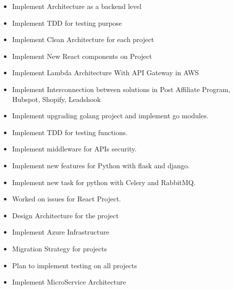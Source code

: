 
\begin{itemize}
    \item Implement Architecture as a backend level
    \item Implement TDD for testing purpose
    \item Implement Clean Architecture for each project
    \item Implement New React components on Project
    \item Implement Lambda Architecture With API Gateway in AWS
    \item Implement Interconnection between solutions in Post Affiliate Program, Hubspot, Shopify, Leadshook
\end{itemize}

\divider

\begin{itemize}
    \item Implement upgrading golang project and implement go modules.
    \item Implement TDD for testing functions.
    \item Implement middleware for APIs security.
    \item Implement new features for Python with flask and django.
    \item Implement new task for python with Celery and RabbitMQ.
    \item Worked on issues for React Project.
\end{itemize}

\divider

\begin{itemize}
    \item Design Architecture for the project
    \item Implement Azure Infrastructure
    \item Migration Strategy for projects
    \item Plan to implement testing on all projects
    \item Implement MicroService Architecture
\end{itemize}

